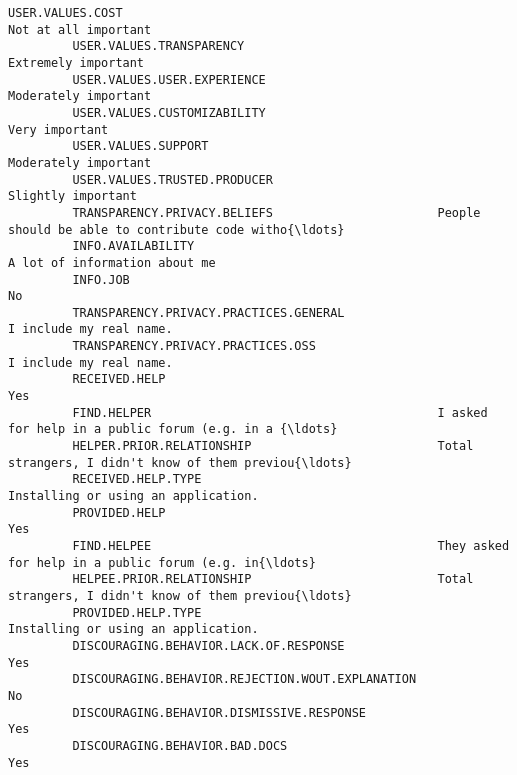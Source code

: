 \documentclass[11pt]{article}
\begin{document}
\begin{Verbatim}[commandchars=\\\{\}]
         USER.VALUES.COST                                                                Not at all important   
         USER.VALUES.TRANSPARENCY                                                         Extremely important   
         USER.VALUES.USER.EXPERIENCE                                                     Moderately important   
         USER.VALUES.CUSTOMIZABILITY                                                           Very important   
         USER.VALUES.SUPPORT                                                             Moderately important   
         USER.VALUES.TRUSTED.PRODUCER                                                      Slightly important   
         TRANSPARENCY.PRIVACY.BELIEFS                       People should be able to contribute code witho{\ldots}   
         INFO.AVAILABILITY                                                      A lot of information about me   
         INFO.JOB                                                                                          No   
         TRANSPARENCY.PRIVACY.PRACTICES.GENERAL                                       I include my real name.   
         TRANSPARENCY.PRIVACY.PRACTICES.OSS                                           I include my real name.   
         RECEIVED.HELP                                                                                    Yes   
         FIND.HELPER                                        I asked for help in a public forum (e.g. in a {\ldots}   
         HELPER.PRIOR.RELATIONSHIP                          Total strangers, I didn't know of them previou{\ldots}   
         RECEIVED.HELP.TYPE                                               Installing or using an application.   
         PROVIDED.HELP                                                                                    Yes   
         FIND.HELPEE                                        They asked for help in a public forum (e.g. in{\ldots}   
         HELPEE.PRIOR.RELATIONSHIP                          Total strangers, I didn't know of them previou{\ldots}   
         PROVIDED.HELP.TYPE                                               Installing or using an application.   
         DISCOURAGING.BEHAVIOR.LACK.OF.RESPONSE                                                           Yes   
         DISCOURAGING.BEHAVIOR.REJECTION.WOUT.EXPLANATION                                                  No   
         DISCOURAGING.BEHAVIOR.DISMISSIVE.RESPONSE                                                        Yes   
         DISCOURAGING.BEHAVIOR.BAD.DOCS                                                                   Yes   

\end{Verbatim}
\end{document}
